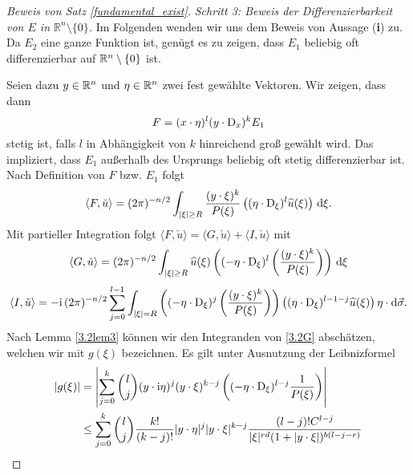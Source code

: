 \begin{proof}[Beweis von Satz \ref{fundamental_exist}]
\medskip
\noindent
{\em Schritt 3: Beweis der Differenzierbarkeit von $E$ in $\mathbb R^n\setminus\{0\}$.}
Im Folgenden wenden wir uns dem Beweis von Aussage ({\bf i}) zu. Da $E_2$ eine ganze Funktion ist, genügt es zu zeigen, dass $E_1$ beliebig oft differenzierbar auf $\mathbb R^n\setminus\{0\}$ ist.  

Seien dazu $y\in\mathbb R^n$ und $\eta\in\mathbb R^n$ zwei fest gewählte Vektoren.  Wir zeigen, dass dann
\begin{equation}
F= (x\cdot \eta)^l (y \cdot \mathrm D_x)^k E_1
\end{equation}
stetig ist, falls $l$ in Abhängigkeit von $k$ hinreichend groß gewählt wird.
Das impliziert, dass  $E_1$  außerhalb des Ursprungs beliebig oft stetig differenzierbar ist.  %
Nach Definition von $F$ bzw. $E_1$ folgt 
\begin{equation}\label{3.2F}
\langle F, \check u\rangle =  (2\pi)^{-n/2}\int_{|\xi|\ge R} \frac{(y\cdot \xi)^k}{P(\xi)} \left ( (\eta\cdot \mathrm D_\xi)^l \widehat u(\xi)\right )\,\mathrm d \xi.
\end{equation}
Mit partieller Integration folgt $\langle F,\check u\rangle=\langle G,\check u\rangle + \langle I,\check u\rangle $ mit
\begin{equation}\label{3.2G}
\langle G,\check u\rangle = (2\pi)^{-n/2} \int_{|\xi|\ge R} \widehat u(\xi) \left ( (-\eta \cdot \mathrm D_\xi)^l \left ( \frac{(y\cdot \xi)^k}{P(\xi)} \right ) \right )\,\mathrm d \xi
\end{equation}
\begin{equation}\label{3.2I}
\langle I,\check u\rangle =- \mathrm i\, (2\pi)^{-n/2} \sum_{j=0}^{l-1} \int_{|\xi|=R} \left ( (-\eta \cdot \mathrm D_\xi)^j \left ( \frac{(y\cdot \xi)^k}{P(\xi)}\right ) \right ) \left ( (\eta \cdot \mathrm D_\xi)^{l-1-j} \widehat u(\xi) \right ) \eta \cdot  \mathrm{d}\vec{\sigma}.
\end{equation}
Nach Lemma \ref{3.2lem3} können wir den Integranden von \eqref{3.2G} abschätzen, welchen wir mit $g(\xi)$ bezeichnen. Es gilt unter Ausnutzung der Leibnizformel
\begin{equation}
\begin{split}
|g(\xi)| &= \left | \sum_{j=0}^k \binom{l}{j} (y\cdot \i\eta)^j (y \cdot \xi)^{k-j} \left ( (-\eta\cdot\D_\xi)^{l-j} \frac{1}{P(\xi)} \right ) \right |\\
&\le \sum_{j=0}^k \binom{l}{j} \frac{k!}{(k-j)!} |y\cdot \eta|^j |y\cdot \xi|^{k-j}  \frac{(l-j)! C^{l-j}}{|\xi|^{rd} (1+|y\cdot \xi|)^{b(l-j-r)}} 

\end{split}
\end{equation}
\end{proof}
